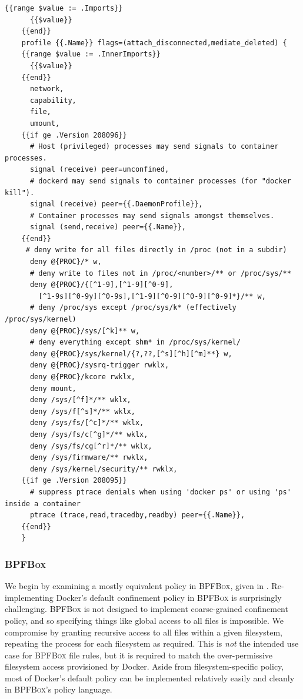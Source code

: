 \documentclass[
  fontsize=12pt,
  titlepage=firstiscover,
  paper=letter,
oneside,
  cleardoublepage=plain,
  parskip=half-,
  DIV=10,
  parindent,
  appendixprefix,
  chapterprefix,
  listof=totoc,
]{scrbook}
\newcommand{\bpfbox}{\textsc{BPFBox}}
\begin{document}
\begin{lstlisting}[language=none, gobble=4,
  caption={[Docker's default AppArmor template]
    Docker's default AppArmor template~\cite{docker_default_apparmor}, at the time of
    writing this thesis. Docker uses Go's string templating syntax to modify the AppArmor
    profile according to the current Docker version and container metadata.
  },
  label={lst:docker-default}, float]
    {{range $value := .Imports}}
      {{$value}}
    {{end}}
    profile {{.Name}} flags=(attach_disconnected,mediate_deleted) {
    {{range $value := .InnerImports}}
      {{$value}}
    {{end}}
      network,
      capability,
      file,
      umount,
    {{if ge .Version 208096}}
      # Host (privileged) processes may send signals to container processes.
      signal (receive) peer=unconfined,
      # dockerd may send signals to container processes (for "docker kill").
      signal (receive) peer={{.DaemonProfile}},
      # Container processes may send signals amongst themselves.
      signal (send,receive) peer={{.Name}},
    {{end}}
     # deny write for all files directly in /proc (not in a subdir)
      deny @{PROC}/* w,
      # deny write to files not in /proc/<number>/** or /proc/sys/**
      deny @{PROC}/{[^1-9],[^1-9][^0-9],
        [^1-9s][^0-9y][^0-9s],[^1-9][^0-9][^0-9][^0-9]*}/** w,
      # deny /proc/sys except /proc/sys/k* (effectively /proc/sys/kernel)
      deny @{PROC}/sys/[^k]** w,
      # deny everything except shm* in /proc/sys/kernel/
      deny @{PROC}/sys/kernel/{?,??,[^s][^h][^m]**} w,
      deny @{PROC}/sysrq-trigger rwklx,
      deny @{PROC}/kcore rwklx,
      deny mount,
      deny /sys/[^f]*/** wklx,
      deny /sys/f[^s]*/** wklx,
      deny /sys/fs/[^c]*/** wklx,
      deny /sys/fs/c[^g]*/** wklx,
      deny /sys/fs/cg[^r]*/** wklx,
      deny /sys/firmware/** rwklx,
      deny /sys/kernel/security/** rwklx,
    {{if ge .Version 208095}}
      # suppress ptrace denials when using 'docker ps' or using 'ps' inside a container
      ptrace (trace,read,tracedby,readby) peer={{.Name}},
    {{end}}
    }
\end{lstlisting}

\subsubsection{\bpfbox{}}

We begin by examining a mostly equivalent policy in \bpfbox{}, given in
.  Re-implementing Docker's default confinement policy in
\bpfbox{} is surprisingly challenging. \bpfbox{} is not designed to implement
coarse-grained confinement policy, and so specifying things like global access to all
files is impossible. We compromise by granting recursive access to all files within
a given filesystem, repeating the process for each filesystem as required. This is
\textit{not} the intended use case for \bpfbox{} file rules, but it is required to match
the over-permissive filesystem access provisioned by Docker. Aside from
filesystem-specific policy, most of Docker's default policy can be implemented relatively
easily and cleanly in \bpfbox{}'s policy language.
\end{document}
